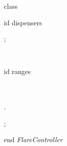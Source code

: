 \begin{vdm}{\small\sf class}
\begin{thread}
\begin{blockstmt}
\begin{setfor}{id}{ \Dom dispensers}
\end{setfor} ; \\
\begin{while}{\True }
\begin{blockstmt}
\begin{defstmt}
\end{defstmt} \\
\begin{setfor}{id}{ \Dom ranges}
\begin{defstmt}
\end{defstmt} \\
\If {}
\Then \\
.
\Fi
\end{setfor} ; \\
\end{blockstmt}
\end{while}
\end{blockstmt}
\end{thread}
{\small\sf end} {\it FlareController}

\end{vdm}



















































































